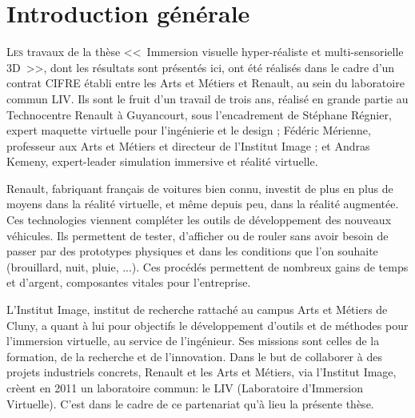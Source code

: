 \chapter*{Introduction générale}

\lettrine[lines=3]{L}{es} travaux de la thèse <<~Immersion visuelle hyper-réaliste et multi-sensorielle 3D~>>, dont les résultats sont présentés ici, ont été réalisés dans le cadre d’un contrat CIFRE établi entre les Arts et Métiers et Renault, au sein du laboratoire commun LIV. Ils sont le fruit d'un travail de trois ans, réalisé en grande partie au Technocentre Renault à Guyancourt, sous l'encadrement de Stéphane Régnier, expert maquette virtuelle pour l'ingénierie et le design ; Fédéric Mérienne, professeur aux Arts et Métiers et directeur de l'Institut Image ; et Andras Kemeny, expert-leader simulation immersive et réalité virtuelle.

\par Renault, fabriquant français de voitures bien connu, investit de plus en plus de moyens dans la réalité virtuelle, et même depuis peu, dans la réalité augmentée. Ces technologies viennent compléter les outils de développement des nouveaux véhicules. Ils permettent de tester, d'afficher ou de rouler sans avoir besoin de passer par des prototypes physiques et dans les conditions que l'on souhaite (brouillard, nuit, pluie, ...). Ces procédés permettent de nombreux gains de temps et d'argent, composantes vitales pour l'entreprise.

\par L'Institut Image, institut de recherche rattaché au campus Arts et Métiers de Cluny, a quant à lui pour objectifs le développement d'outils et de méthodes pour l'immersion virtuelle, au service de l'ingénieur. Ses missions sont celles de la formation, de la recherche et de l'innovation. Dans le but de collaborer à des projets industriels concrets, Renault et les Arts et Métiers, via l'Institut Image, crèent en 2011 un laboratoire commun: le LIV (Laboratoire d'Immersion Virtuelle). C'est dans le cadre de ce partenariat qu'à lieu la présente thèse.

